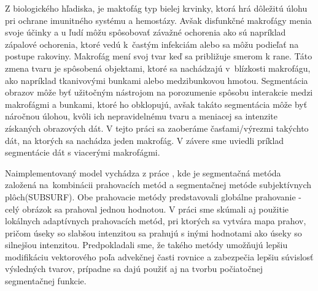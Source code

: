 \documentclass[a4paper,11pt,oneside]{article}%
\begin{document}
Z biologického hľadiska, je maktofág typ bielej krvinky, ktorá hrá dôležitú úlohu pri ochrane imunitného systému a hemostázy. Avšak disfunkčné makrofágy menia svoje účinky a u ľudí môžu spôsobovať závažné ochorenia ako sú napríklad  zápalové ochorenia, ktoré vedú k~častým infekciám alebo sa môžu podieľať na postupe rakoviny. Makrofág mení svoj tvar keď sa približuje smerom k rane. Táto zmena tvaru je spôsobená objektami, ktoré sa nachádzajú v~blízkosti makrofágu, ako napríklad tkanivovými bunkami alebo medzibunkovou hmotou.
Segmentácia obrazov môže byť užitočným nástrojom na porozumenie spôsobu interakcie medzi makrofágmi a bunkami, ktoré ho obklopujú, avšak takáto segmentácia môže byť náročnou úlohou, kvôli ich nepravidelnému tvaru a meniacej sa intenzite získaných obrazových dát. V tejto práci sa zaoberáme časťami/výrezmi takýchto dát, na ktorých sa nachádza jeden makrofág. V závere sme uviedli príklad 
segmentácie dát s  viacerými makrofágmi.



Naimplementovaný model vychádza z práce \cite{sora}, kde je segmentačná metóda založená na~kombinácii prahovacích metód a segmentačnej metóde subjektívnych plôch(SUBSURF). Obe prahovacie metódy predstavovali globálne prahovanie - celý obrázok sa prahoval jednou hodnotou. V práci sme  skúmali aj použitie lokálnych adaptívnych prahovacích metód, pri ktorých sa vytvára mapa prahov, pričom úseky so slabšou intenzitou sa prahujú s inými hodnotami ako úseky so silnejšou intenzitou. Predpokladali sme, že takého metódy umožňujú lepšiu modifikáciu vektorového poľa advekčnej časti rovnice a zabezpečia lepšiu súvislosť výsledných tvarov, prípadne sa dajú použiť aj na tvorbu počiatočnej segmentačnej funkcie.
\end{document}
